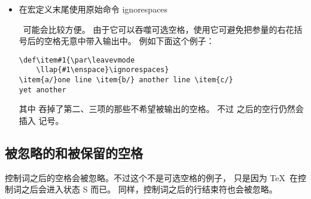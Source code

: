 \documentclass{book}
\begin{document}
\begin{itemize}
\item 在宏定义末尾使用原始命令 \csterm ignorespaces\par\ 可能会比较方便。
由于它可以吞噬可选空格，使用它可避免把参量的右花括号后的空格无意中带入输出中。
例如下面这个例子：
\begin{verbatim}
\def\item#1{\par\leavevmode
    \llap{#1\enspace}\ignorespaces}
\item{a/}one line \item{b/} another line \item{c/}
yet another
\end{verbatim}
其中  吞掉了第二、三项的那些不希望被输出的空格。
不过  之后的空行仍然会插入  记号。
\end{itemize}

\subsection{被忽略的和被保留的空格}

控制词之后的空格会被忽略。不过这个不是可选空格的例子，
只是因为 \TeX\ 在控制词之后会进入状态 {\italic S} 而已。
同样，控制词之后的行结束符也会被忽略。
\end{document}
